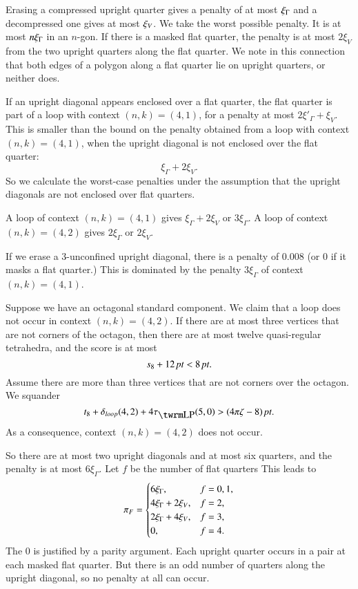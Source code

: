 Erasing a compressed upright quarter gives a penalty of
at most $\xi_\Gamma$ and a decompressed one gives at most $\xi_V$. We
take the worst possible penalty.  It is at most $n\xi_\Gamma$ in an
$n$-gon. If there is a masked flat quarter, the penalty is at most
$2\xi_V$ from the two upright quarters along the flat quarter.  We
note in this connection that both edges of a polygon along a flat
quarter lie on upright quarters, or neither does.

If an upright diagonal appears enclosed over a flat quarter, the
flat quarter is part of a loop with context $(n,k)=(4,1)$, for a
penalty at most $2\xi'_\Gamma+\xi_V$.  This is smaller than the
bound on the penalty obtained from a loop with context
$(n,k)=(4,1)$, when the upright diagonal is not enclosed over the
flat quarter:
    $$\xi_\Gamma + 2\xi_V.$$
So we calculate the worst-case penalties under the assumption that
the upright diagonals are not enclosed over flat quarters.

A loop of context $(n,k)=(4,1)$ gives $\xi_\Gamma+2\xi_V$ or
$3\xi_\Gamma$.  A loop of context $(n,k)=(4,2)$ gives
$2\xi_\Gamma$ or $2\xi_V$.

If we erase a $3$-unconfined upright diagonal, there is a penalty
of $0.008$ (or 0 if it masks a flat quarter.) This is dominated by
the penalty $3\xi_\Gamma$ of context $(n,k)=(4,1)$.

Suppose we have an octagonal standard component.  We claim that a loop
does not occur in context $(n,k)=(4,2)$. If there are at most three
vertices that are not corners of the octagon, then there are at most
twelve quasi-regular tetrahedra, and the score is at most
$$s_8 + 12\,\hbox{\it pt}<8\,\hbox{\it pt}.$$
Assume there are more than three vertices that are not corners
over the octagon. We squander
$$t_8+ \dloop(4,2)+4\tlp(5,0) > \squander.$$
As a consequence, context $(n,k)=(4,2)$ does not occur.

So there are at most two upright diagonals and at most six quarters,
and the penalty is at most $6\xi_\Gamma$. Let $f$ be the number of
flat quarters This leads to
    $$
    {\pi_F} = \begin{cases} 6\xi_\Gamma, & f=0,1,\\
                   4\xi_\Gamma+2\xi_V, & f=2,\\
                    2\xi_\Gamma+4\xi_V, & f=3,\\
                    0, & f=4.
            \end{cases}
    $$
The 0 is justified by a parity argument.  Each upright quarter
occurs in a pair at each masked flat quarter.  But there is an odd
number of quarters along the upright diagonal, so no penalty at
all can occur.


